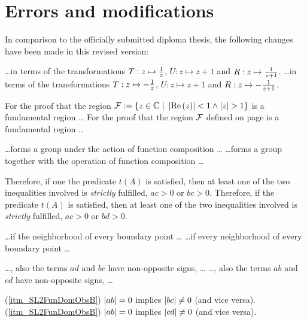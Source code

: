 \chapter{Errors and modifications}

In comparison to the officially submitted diploma thesis, the following changes have been made in this revised version:

\begin{description}
{\dots in terms of the transformations $T : z \mapsto \frac{1}{z}$, $U : z \mapsto z+1$ and $R : z \mapsto \frac{1}{z+1}$.}
{\dots in terms of the transformations $T : z \mapsto -\frac{1}{z}$, $U : z \mapsto z+1$ and $R : z \mapsto -\frac{1}{z+1}$.}

{For the proof that the region $\mathcal{F} := \{ z \in \mathbb{C} \ | \ \left|\operatorname{Re}\left(z\right)\right| < 1 \land \left|z\right| > 1 \}$ is a fundamental region \dots}
{For the proof that the region $\mathcal{F}$ defined on page \pageref{eqn_PSL2FunDom} is a fundamental region \dots}

{\dots forms a group under the action of function composition \dots}
{\dots forms a group together with the operation of function composition \dots}

{Therefore, if one the predicate $t(A)$ is satisfied, then at least one of the two inequalities involved is \emph{strictly} fulfilled, \ie $ac > 0$ or $bc > 0$.}
{Therefore, if the predicate $t(A)$ is satisfied, then at least one of the two inequalities involved is \emph{strictly} fulfilled, \ie $ac > 0$ or $bd > 0$.}

{\dots if the neighborhood of every boundary point \dots}
{\dots if every neighborhood of every boundary point \dots}

{\dots, \ie also the terms $ad$ and  $bc$ have non-opposite signs, \dots}
{\dots, \ie also the terms $ab$ and $cd$ have non-opposite signs, \dots}

{(\ref{itm_SL2FunDomObsB})\quad
$\left|ab\right| = 0$ implies $\left|bc\right| \ne 0$ (and vice versa).}
{(\ref{itm_SL2FunDomObsB})\quad
$\left|ab\right| = 0$ implies $\left|cd\right| \ne 0$ (and vice versa).}


\end{description}
